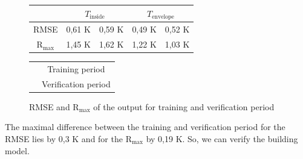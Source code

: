      \begin{figure}[h]
    \begin{minipage}[t]{0.5\textwidth}
    \vspace{0pt}
        \begin{tabular}{c|c|c|c|c}
             & \multicolumn{2}{|c}{$T_\text{inside}$} & \multicolumn{2}{|c}{$T_\text{envelope}$} \\
             \hline
            RMSE & \cellcolor{gray} 0,61 K & \cellcolor{gray90} 0,59 K & \cellcolor{gray} 0,49 K & \cellcolor{gray90} 0,52 K \\
            $\mathrm{R}_\text{max}$ &\cellcolor{gray} 1,45 K & \cellcolor{gray90} 1,62 K & \cellcolor{gray} 1,22 K & \cellcolor{gray90} 1,03 K
        \end{tabular}
    \end{minipage}
    \hfill
    \begin{minipage}[t]{0.5\textwidth}
    \vspace{0pt}
        \begin{tabular}{c c}
        \\
            &\cellcolor{gray} Training period \\
           &\cellcolor{gray90} Verification period
        \end{tabular}
    \end{minipage}
    \caption{RMSE and $\mathrm{R}_\text{max}$ of the output for training and verification period}
    \label{tab:RMSEundR}
    \end{figure}
    The maximal difference between the training and verification period for the RMSE lies by 0,3 K and for the $\mathrm{R}_\text{max}$ by 0,19 K. So, we can verify the building model.  

